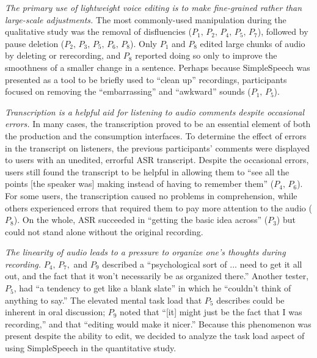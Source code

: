 \emph{The primary use of lightweight voice editing is to make fine-grained rather than large-scale adjustments.}
The most commonly-used manipulation during the qualitative study was the removal of disfluencies ($P_1,\,P_2,\,P_4,\,P_5,\,P_7$), followed by pause deletion ($P_2,\,P_3,\,P_5,\,P_6,\,P_8$). 
Only $P_1$ and $P_8$ edited large chunks of audio by deleting or rerecording, and $P_8$ reported doing so only to improve the smoothness of a smaller change in a sentence.
Perhaps because SimpleSpeech was presented as a tool to be briefly used to ``clean up'' recordings, participants focused on removing the ``embarrassing'' and ``awkward'' sounds ($P_1,\,P_5$).

\emph{Transcription is a helpful aid for listening to audio comments despite occasional errors.}
In many cases, the transcription proved to be an essential element of both the production and the consumption interfaces. 
To determine the effect of errors in the transcript on listeners, the previous participants' comments were displayed to users with an unedited, errorful ASR transcript. 
Despite the occasional errors, users still found the transcript to be helpful in allowing them to ``see all the points [the speaker was] making instead of having to remember them'' ($P_4,\,P_6$). 
For some users, the transcription caused no problems in comprehension, while others experienced errors that required them to pay more attention to the audio ($P_8$). 
On the whole, ASR succeeded in ``getting the basic idea across'' ($P_3$) but could not stand alone without the original recording. 

\emph{The linearity of audio leads to a pressure to organize one's thoughts during recording.}
$P_4,\,P_7,$ and $P_9$ described a ``psychological sort of ... need to get it all out, and the fact that it won't necessarily be as organized there.'' 
Another tester, $P_5$, had ``a tendency to get like a blank slate'' in which he ``couldn't think of anything to say.'' 
The elevated mental task load that $P_5$ describes could be inherent in oral discussion; $P_9$ noted that ``[it] might just be the fact that I was recording,'' and that ``editing would make it nicer.'' 
Because this phenomenon was present despite the ability to edit, we decided to analyze the task load aspect of using SimpleSpeech in the quantitative study.

